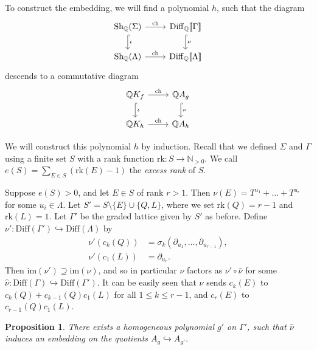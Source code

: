 \documentclass[oneside]{amsart}
\theoremstyle{plain}
\newtheorem{proposition}[theorem]{Proposition}
\theoremstyle{definition}
\newcommand{\N}{{\mathbb{N}}}
\newcommand{\Q}{{\mathbb{Q}}}
\newcommand{\rk}{{\mathrm{rk}}}
\newcommand{\Diff}{{\mathrm{Diff}}}
\newcommand{\im}{{\mathrm{im}}}
\newcommand{\Sh}{{\mathrm{Sh}}}
\newcommand{\ch}{{\mathrm{ch}}}
\begin{document}
To construct the embedding, we will find a polynomial $h$, such that the diagram
\[
\begin{tikzcd}
	\Sh_\Q(\Sigma) & \Diff_\Q \llbracket \Gamma \rrbracket\\
	\Sh_\Q(\Lambda) & \Diff_\Q\llbracket \Lambda \rrbracket
	\arrow["\ch", from=1-1, to=1-2]
	\arrow["\iota", hook, from=1-1, to=2-1]
	\arrow["\nu", hook, from=1-2, to=2-2]
	\arrow["\ch", from=2-1, to=2-2]
\end{tikzcd}
\]
descends to a commutative diagram
\[\begin{tikzcd}
	\Q K_f & \Q A_g \\
	\Q K_{h} & \Q A_{h}
	\arrow["\ch", from=1-1, to=1-2]
	\arrow["\iota", hook, from=1-1, to=2-1]
	\arrow["\nu", hook, from=1-2, to=2-2]
	\arrow["\ch", from=2-1, to=2-2]
\end{tikzcd}\]

We will construct this polynomial $h$ by induction. Recall that we defined $\Sigma$ and $\Gamma$ using a finite set $S$ with a rank function $\rk: S \to \N_{> 0}$. We call $e(S) = \sum_{E \in S} (\rk(E) - 1)$ the \emph{excess rank} of $S$.

Suppose $e(S) > 0$, and let $E \in S$ of rank $r > 1$. Then $\nu(E) = T^{u_1} + \dots + T^{u_r}$ for some $u_i \in \Lambda$.
Let $S' = S\setminus\{E\}\cup \{Q, L\}$, where we set $\rk(Q) = r - 1$ and $\rk(L) = 1$.
Let $\Gamma'$ be the graded lattice given by $S'$ as before.
Define $\nu' : \Diff(\Gamma') \hookrightarrow \Diff(\Lambda)$ by 
\begin{align*}
    \nu'(c_k(Q)) &= \sigma_k(\partial_{u_1}, \dots, \partial_{u_{r - 1}}),\\
    \nu'(c_1(L)) &= \partial_{u_r}.
\end{align*}
Then $\im(\nu') \supseteq \im(\nu)$, and so in particular $\nu$ factors as $\nu' \circ \hat \nu$ for some
$\hat \nu : \Diff(\Gamma) \hookrightarrow \Diff(\Gamma')$. It can be easily seen that $\hat \nu$
sends $c_k(E)$ to $c_k(Q) + c_{k-1}(Q)c_1(L)$ for all $1 \leq k \leq r-1$,
and $c_r(E)$ to $c_{r-1}(Q) c_1(L)$.

\begin{proposition}\label{prop:proj-bundle-construction}
    There exists a homogeneous polynomial $g'$ on $\Gamma'$, such that $\hat \nu$ induces an embedding on the quotients $A_g \hookrightarrow A_{g'}$.
\end{proposition}
\end{document}
